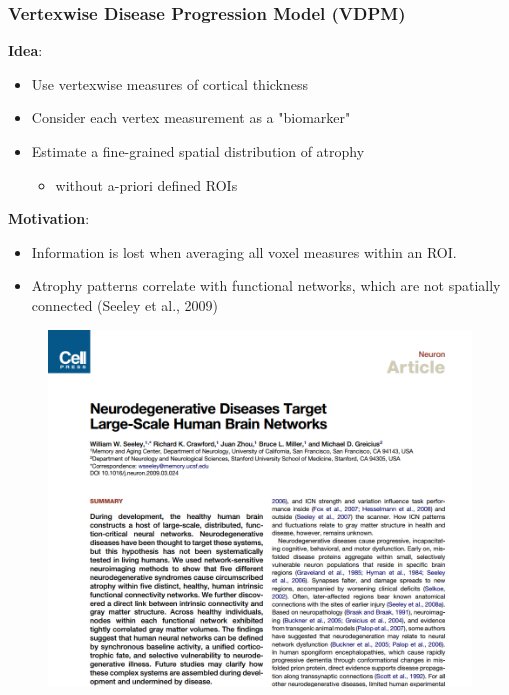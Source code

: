 \documentclass[10pt,xcolor=table]{beamer}
\begin{document}
\begin{frame}
\frametitle{Vertexwise Disease Progression Model (VDPM)}

\vspace{-3em}
\textbf{Idea}:
\begin{itemize}
 \item Use vertexwise measures of cortical thickness
 \item Consider each vertex measurement as a "biomarker"
 \item Estimate a fine-grained spatial distribution of atrophy 
  \begin{itemize}
  \item without a-priori defined ROIs
 \end{itemize}
\end{itemize}
\textbf{Motivation}:
\begin{itemize}
 \item Information is lost when averaging all voxel measures within an ROI.
 \item Atrophy patterns correlate with functional networks, which are not spatially connected (Seeley et al., 2009)
\end{itemize}

\vspace{-1em}

\begin{figure}
\centering
\includegraphics[scale=0.3, trim= 0 800 0 0]{seeley.png}
\end{figure}



\end{frame}
\end{document}
